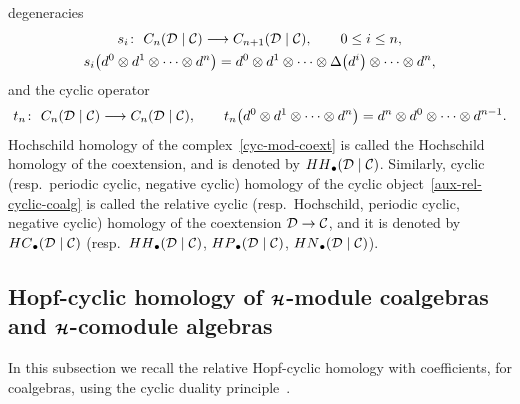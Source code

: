 \documentclass[11pt]{article}
\numberwithin{equation}{section}
\begin{document}
degeneracies
\begin{gather*}%
s_i\colon \ {\rm C}_n({\cal D}\mid{\cal C}) \longrightarrow {\rm C}_{n+1}({\cal D}\mid{\cal C}),
\qquad
0 \leq i \leq n,
\\
s_i\big(d^0\otimes d^1\otimes \cdots\otimes d^n\big) =d^0\otimes d^1\otimes \cdots \otimes\Delta\big(d^i\big)\otimes \cdots \otimes
d^n,
\end{gather*}
and the cyclic operator
\begin{gather*}%
t_n\colon \ {\rm C}_n({\cal D}\mid{\cal C}) \longrightarrow {\rm C}_n({\cal D}\mid{\cal C}),
\qquad
t_n\big(d^0\otimes d^1\otimes \cdots\otimes d^n\big) =d^n\otimes d^0\otimes \cdots\otimes d^{n-1}.
\end{gather*}
Hochschild homology of the complex~\eqref{cyc-mod-coext} is called the Hochschild homology of the coextension, and is
denoted by ${\rm HH}_\bullet({\cal D}\mid{\cal C})$.
Similarly, cyclic (resp.\
periodic cyclic, negative cyclic) homology of the cyclic object~\eqref{aux-rel-cyclic-coalg} is called the relative
cyclic (resp.\
Hochschild, periodic cyclic, negative cyclic) homology of the coextension ${\cal D} \rightarrow{\cal C}$, and it is
denoted by ${\rm HC}_\bullet({\cal D}\mid{\cal C})$ (resp.\
${\rm HH}_\bullet({\cal D}\mid{\cal C})$, ${\rm HP}_\bullet({\cal D}\mid{\cal C})$, ${\rm HN}_\bullet({\cal D}\mid{\cal C})$).

\subsection[Hopf-cyclic homology of ${\cal H}$-module coalgebras and ${\cal H}$-comodule algebras]{Hopf-cyclic homology
of $\boldsymbol{\cal H}$-module coalgebras and $\boldsymbol{\cal H}$-comodule algebras}

In this subsection we recall the relative Hopf-cyclic homology with coef\/f\/icients, for coalgebras, using the cyclic
duality principle~\cite{Conn83,KhalRang05}.
\end{document}
